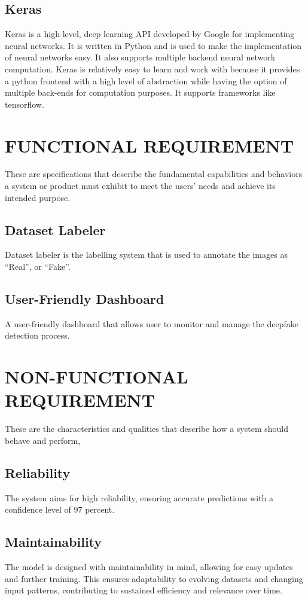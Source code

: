             \subsection{Keras}
                Keras is a high-level, deep learning API developed by Google for implementing neural networks. It is written in Python and is used to make the implementation of neural networks easy. It also supports multiple backend neural network computation. Keras is relatively easy to learn and work with because it provides a python frontend with a high level of abstraction while having the option of multiple back-ends for computation purposes. It supports frameworks like tensorflow.
                
        \section{FUNCTIONAL REQUIREMENT}
            These are specifications that describe the fundamental capabilities and behaviors a system or product must exhibit to meet the users' needs and achieve its intended purpose. 

            \subsection{Dataset Labeler}
                Dataset labeler is the labelling system that is used to annotate the images as “Real”, or “Fake”.

            \subsection{User-Friendly Dashboard}
                A user-friendly dashboard that allows user to monitor and manage the deepfake detection process.

        \section{NON-FUNCTIONAL REQUIREMENT}
            These are the characteristics and qualities that describe how a system should behave and perform,

            \subsection{Reliability}
                The system aims for high reliability, ensuring accurate predictions with a confidence level of 97 percent.
            \subsection{Maintainability}
                The model is designed with maintainability in mind, allowing for easy updates and further training. This ensures adaptability to evolving datasets and changing input patterns, contributing to sustained efficiency and relevance over time.
